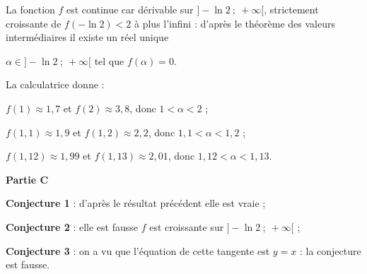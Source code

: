 \documentclass[10pt]{article}
\begin{document}
\begin{enumerate}
La fonction $f$ est continue car dérivable sur $]- \ln 2~;~+ \infty[$, strictement croissante de $f(- \ln 2) < 2$ à plus l'infini : d'après le théorème des valeurs intermédiaires il existe un réel unique 

$\alpha \in ]- \ln 2~;~+ \infty[$ tel que $f(\alpha) = 0$.

La calculatrice donne :

$f(1) \approx 1,7$ et $f(2) \approx 3,8$, donc $1 < \alpha < 2$ ;

$f(1,1) \approx 1,9$ et $f(1,2) \approx 2,2$, donc $1,1 < \alpha < 1,2$ ;

$f(1,12) \approx 1,99$ et $f(1,13) \approx 2,01$, donc $1,12 < \alpha < 1,13$.
\end{enumerate}

\medskip

\textbf{Partie C}

\medskip


\textbf{Conjecture 1} : d'après le résultat précédent elle est vraie ;

\textbf{Conjecture 2} : elle est fausse $f$ est croissante sur $]- \ln 2~;~+ \infty[$ ;

\textbf{Conjecture 3} : on a vu que l'équation de cette tangente est $y = x$ : la conjecture est fausse.

\medskip
\end{document}
